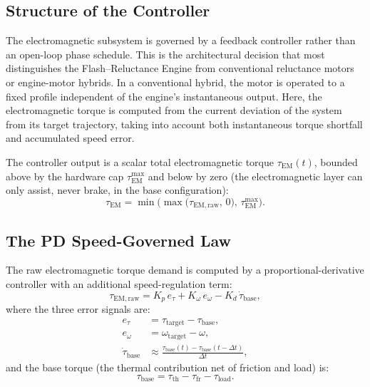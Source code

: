 \documentclass[11pt, a4paper]{article}
\theoremstyle{plain}
\theoremstyle{definition}
\newcommand{\tauEM}{\tau_{\mathrm{EM}}}
\newcommand{\tauth}{\tau_{\mathrm{th}}}
\newcommand{\taufr}{\tau_{\mathrm{fr}}}
\newcommand{\tauload}{\tau_{\mathrm{load}}}
\newcommand{\om}{\omega}
\begin{document}
\subsection{Structure of the Controller}

The electromagnetic subsystem is governed by a feedback controller rather than an open-loop phase schedule. This is the architectural decision that most distinguishes the Flash--Reluctance Engine from conventional reluctance motors or engine-motor hybrids. In a conventional hybrid, the motor is operated to a fixed profile independent of the engine's instantaneous output. Here, the electromagnetic torque is computed from the current deviation of the system from its target trajectory, taking into account both instantaneous torque shortfall and accumulated speed error.

The controller output is a scalar total electromagnetic torque $\tauEM(t)$, bounded above by the hardware cap $\tauEM^{\mathrm{max}}$ and below by zero (the electromagnetic layer can only assist, never brake, in the base configuration):
\begin{equation}
  \tauEM = \min\!\bigl(\max\!\bigl(\tau_{\mathrm{EM,raw}},\, 0\bigr),\, \tauEM^{\mathrm{max}}\bigr).
  \label{eq:tauEM_clamp}
\end{equation}

\subsection{The PD Speed-Governed Law}

The raw electromagnetic torque demand is computed by a proportional-derivative controller with an additional speed-regulation term:
\begin{equation}
  \tau_{\mathrm{EM,raw}} = K_p\, e_\tau + K_\om\, e_\om - K_d\, \dot{\tau}_{\mathrm{base}},
  \label{eq:control_law}
\end{equation}
where the three error signals are:
\begin{align}
  e_\tau &= \tau_{\mathrm{target}} - \tau_{\mathrm{base}}, \label{eq:etau}\\
  e_\om  &= \om_{\mathrm{target}} - \om, \label{eq:eom}\\
  \dot{\tau}_{\mathrm{base}} &\approx \frac{\tau_{\mathrm{base}}(t) - \tau_{\mathrm{base}}(t-\Delta t)}{\Delta t}, \label{eq:dtau}
\end{align}
and the base torque (the thermal contribution net of friction and load) is:
\begin{equation}
  \tau_{\mathrm{base}} = \tauth - \taufr - \tauload.
\end{equation}
\end{document}

